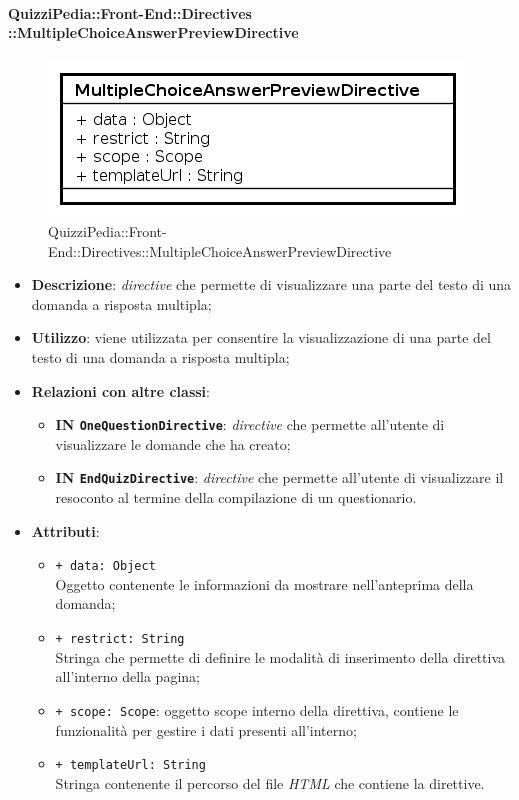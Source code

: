	\paragraph{QuizziPedia::Front-End::Directives\\::MultipleChoiceAnswerPreviewDirective}
		
		\label{QuizziPedia::Front-End::Directives::MultipleChoiceAnswerPreviewDirective}
		
		\begin{figure}[ht]
			\centering
			\includegraphics[scale=0.80,keepaspectratio]{UML/Classi/Front-End/QuizziPedia_Front-end_Directives_MultipleChoiceAnswerPreviewDirective.png}
			\caption{QuizziPedia::Front-End::Directives::MultipleChoiceAnswerPreviewDirective}
		\end{figure} \FloatBarrier
		
		\begin{itemize}
			\item \textbf{Descrizione}: \textit{directive} che permette di visualizzare una parte del testo di una domanda a risposta multipla;
			\item \textbf{Utilizzo}: viene utilizzata per consentire la visualizzazione di una parte del testo di una domanda a risposta multipla;
			\item \textbf{Relazioni con altre classi}: 
			\begin{itemize}
				\item \textbf{IN \texttt{OneQuestionDirective}}: \textit{directive} che permette all'utente di visualizzare le domande che ha creato;
				\item \textbf{IN \texttt{EndQuizDirective}}: \textit{directive} che permette all'utente di visualizzare il resoconto al termine della compilazione di un questionario.
			\end{itemize}
			\item \textbf{Attributi}:
			\begin{itemize}
				\item \texttt{+ data: Object} \\ Oggetto contenente le informazioni da mostrare nell'anteprima della domanda;
		\item \texttt{+ restrict: String} \\ Stringa che permette di definire le modalità di inserimento della direttiva all'interno della pagina;
		\item \texttt{+ scope: Scope}: oggetto scope interno della direttiva, contiene le funzionalità per gestire i dati presenti all'interno;
		\item \texttt{+ templateUrl: String} \\ Stringa contenente il percorso del file \textit{HTML} che contiene la direttive.
			\end{itemize}
		\end{itemize}